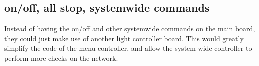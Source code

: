 \documentclass{article}
\begin{document}
     \subsection{on/off, all stop, systemwide commands}
     Instead of having the on/off and other systemwide commands on the main board, they could just make use of another light controller board.
     This would greatly simplify the code of the menu controller, and allow the system-wide controller to perform more checks on the network.
     
\end{document}
